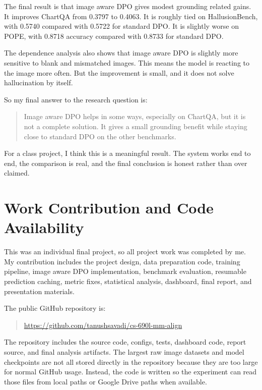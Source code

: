 \documentclass{article}
\begin{document}
The final result is that image aware DPO gives modest grounding related gains.
It improves ChartQA from 0.3797 to 0.4063.
It is roughly tied on HallusionBench, with 0.5740 compared with 0.5722 for standard DPO.
It is slightly worse on POPE, with 0.8718 accuracy compared with 0.8733 for standard DPO.

The dependence analysis also shows that image aware DPO is slightly more sensitive to blank and mismatched images.
This means the model is reacting to the image more often.
But the improvement is small, and it does not solve hallucination by itself.

So my final answer to the research question is:

\begin{quote}
Image aware DPO helps in some ways, especially on ChartQA, but it is not a complete solution.
It gives a small grounding benefit while staying close to standard DPO on the other benchmarks.
\end{quote}

For a class project, I think this is a meaningful result.
The system works end to end, the comparison is real, and the final conclusion is honest rather than over claimed.

\section{Work Contribution and Code Availability}
This was an individual final project, so all project work was completed by me.
My contribution includes the project design, data preparation code, training pipeline, image aware DPO implementation, benchmark evaluation, resumable prediction caching, metric fixes, statistical analysis, dashboard, final report, and presentation materials.

The public GitHub repository is:
\begin{quote}
\url{https://github.com/tanushsavadi/cs-690l-mm-align}
\end{quote}

The repository includes the source code, configs, tests, dashboard code, report source, and final analysis artifacts.
The largest raw image datasets and model checkpoints are not all stored directly in the repository because they are too large for normal GitHub usage.
Instead, the code is written so the experiment can read those files from local paths or Google Drive paths when available.
\end{document}

